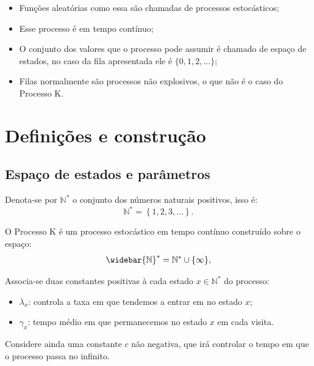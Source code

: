 \documentclass[xcolor=pdftex,dvipsnames]{beamer}
\newcommand{\Nz}{{\mathbb{N^*}}}
\newcommand{\Nzb}{{\mathbb{\widebar{N}^*}}}
\begin{document}
\begin{frame}
  \begin{itemize}
  \item Funções aleatórias como essa são chamadas de processos
    estocásticos;
  \item Esse processo é em tempo contínuo;
  \item O conjunto dos valores que o processo pode assumir é chamado
    de espaço de estados, no caso da fila apresentada ele é $\{0, 1,
    2, \ldots\}$;
  \item Filas normalmente são processos não explosivos, o que não é o
    caso do Processo K.
  \end{itemize}
\end{frame}

\section{Definições e construção}

\subsection{Espaço de estados e parâmetros}

\begin{frame}

  Denota-se por $\Nz$ o conjunto dos números naturais positivos, isso
  é:
  \begin{displaymath}
    \Nz = \left\{ 1, 2, 3, \ldots \right\}.
  \end{displaymath}

  O Processo K é um processo estocástico em tempo contínuo construído
  sobre o espaço:
  \begin{displaymath}
    \Nzb = \Nz \cup \{ \infty \},
  \end{displaymath}

\end{frame}


\begin{frame}

  Associa-se duas constantes positivas à cada estado $x \in \Nz$ do
  processo:

  \begin{itemize}
  \item $\lambda_x$: controla a taxa em que tendemos a entrar em no
    estado $x$;
    
  \item $\gamma_x$: tempo médio em que permanecemos no estado $x$ em
    cada visita.
  \end{itemize}

  Considere ainda uma constante $c$ não negativa, que irá controlar 
  o tempo em que o processo passa no infinito.

\end{frame}
\end{document}
